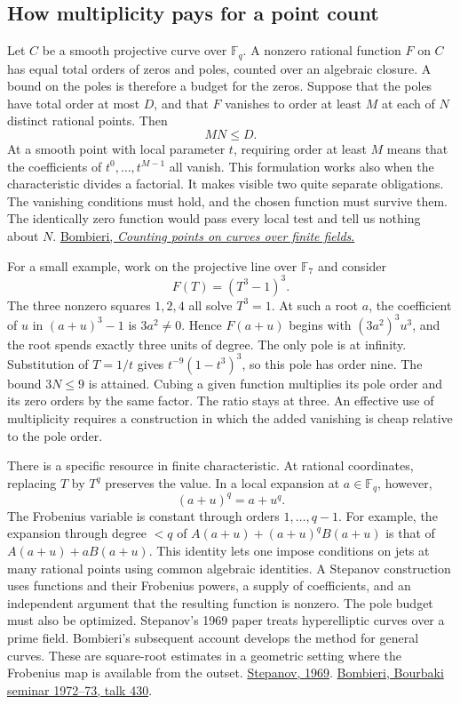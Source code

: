 \documentclass[11pt,letterpaper]{article}
\begin{document}
\subsection{How multiplicity pays for a point count}

Let \(C\) be a smooth projective curve over \(\mathbb F_q\). A nonzero rational function \(F\) on \(C\) has equal total orders of zeros and poles, counted over an algebraic closure. A bound on the poles is therefore a budget for the zeros. Suppose that the poles have total order at most \(D\), and that \(F\) vanishes to order at least \(M\) at each of \(N\) distinct rational points. Then
\[
                         MN\le D.
\]
At a smooth point with local parameter \(t\), requiring order at least \(M\) means that the coefficients of \(t^0,\ldots,t^{M-1}\) all vanish. This formulation works also when the characteristic divides a factorial. It makes visible two quite separate obligations. The vanishing conditions must hold, and the chosen function must survive them. The identically zero function would pass every local test and tell us nothing about \(N\). \href{https://numdam.org/item/SB_1972-1973__15__234_0/}{Bombieri, \emph{Counting points on curves over finite fields}.}

For a small example, work on the projective line over \(\mathbb F_7\) and consider
\[
                     F(T)=(T^3-1)^3 .
\]
The three nonzero squares \(1,2,4\) all solve \(T^3=1\). At such a root \(a\), the coefficient of \(u\) in \((a+u)^3-1\) is \(3a^2\ne0\). Hence \(F(a+u)\) begins with \((3a^2)^3u^3\), and the root spends exactly three units of degree. The only pole is at infinity. Substitution of \(T=1/t\) gives \(t^{-9}(1-t^3)^3\), so this pole has order nine. The bound \(3N\le9\) is attained. Cubing a given function multiplies its pole order and its zero orders by the same factor. The ratio stays at three. An effective use of multiplicity requires a construction in which the added vanishing is cheap relative to the pole order.

There is a specific resource in finite characteristic. At rational coordinates, replacing \(T\) by \(T^q\) preserves the value. In a local expansion at \(a\in\mathbb F_q\), however,
\[
                    (a+u)^q=a+u^q .
\]
The Frobenius variable is constant through orders \(1,\ldots,q-1\). For example, the expansion through degree \(<q\) of \(A(a+u)+(a+u)^q B(a+u)\) is that of \(A(a+u)+a B(a+u)\). This identity lets one impose conditions on jets at many rational points using common algebraic identities. A Stepanov construction uses functions and their Frobenius powers, a supply of coefficients, and an independent argument that the resulting function is nonzero. The pole budget must also be optimized. Stepanov's 1969 paper treats hyperelliptic curves over a prime field. Bombieri's subsequent account develops the method for general curves. These are square-root estimates in a geometric setting where the Frobenius map is available from the outset. \href{https://doi.org/10.1070/IM1969v003n05ABEH000834}{Stepanov, 1969}. \href{https://numdam.org/item/SB_1972-1973__15__234_0/}{Bombieri, Bourbaki seminar 1972--73, talk 430}.
\end{document}
